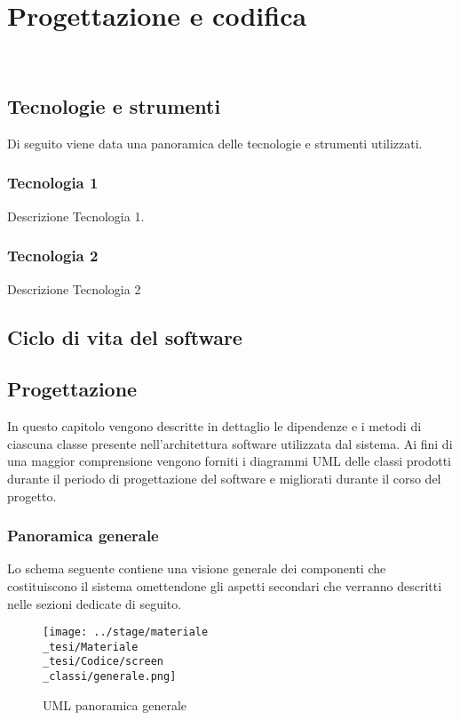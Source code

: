 \chapter{Progettazione e codifica}
\label{cap:progettazione-codifica}

\\

\section{Tecnologie e strumenti}
\label{sec:tecnologie-strumenti}

Di seguito viene data una panoramica delle tecnologie e strumenti utilizzati.

\subsection*{Tecnologia 1}
Descrizione Tecnologia 1.

\subsection*{Tecnologia 2}
Descrizione Tecnologia 2

\section{Ciclo di vita del software}
\label{sec:ciclo-vita-software}

\section{Progettazione}
\label{sec:progettazione}
In questo capitolo vengono descritte in dettaglio le dipendenze e i metodi di ciascuna classe presente nell'architettura software utilizzata dal sistema.
Ai fini di una maggior comprensione vengono forniti i diagrammi UML delle classi prodotti durante il periodo di progettazione del software e migliorati durante il corso del progetto.
\subsection{Panoramica generale} %
Lo schema seguente contiene una visione generale dei componenti che costituiscono il sistema omettendone gli aspetti secondari che verranno descritti nelle sezioni dedicate di seguito.
\newpage
\begin{landscape}
\pagestyle{fancy}

\begin{figure}[!h] 
    \centering
    \texttt{[image: ../stage/materiale\\\_tesi/Materiale\\\_tesi/Codice/screen\\\_classi/generale.png]} 
    \caption{UML panoramica generale}
\end{figure}  
\end{landscape}
